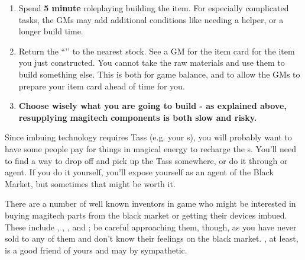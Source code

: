 \documentclass[green]{GL2020}
\begin{document}
\begin{enumerate}
\begin{enumerate}
  \item Spend \textbf{5 minute} roleplaying building the item. For especially complicated tasks, the GMs may add additional conditions like needing a helper, or a longer build time.
  \item Return the ``\iMagitechParts{}’’ to the nearest stock. See a GM for the item card for the item you just constructed. You cannot take the raw materials and use them to build something else. This is both for game balance, and to allow the GMs to prepare your item card ahead of time for you.
   \item \textbf{Choose wisely what you are going to build - as explained above, resupplying magitech components is both slow and risky.}
  \end{enumerate}
\end{enumerate}

Since imbuing technology requires Tass (e.g. your \iChargingStone{}s), you will probably want to have some people pay for things in magical energy to recharge the \iChargingStone{}s. You’ll need to find a way to drop off and pick up the Tass somewhere, or do it through \cChupSecond{} or \cChupSecond{\their} agent. If you do it yourself, you’ll expose yourself as an agent of the Black Market, but sometimes that might be worth it.

There are a number of well known inventors in game who might be interested in buying magitech parts from the black market or getting their devices imbued. These include \cTechStar{}, \cAssistantScientist{}, \cBunker{}, and \cHeadScientist{}; be careful approaching them, though, as you have never sold to any of them and don’t know their feelings on the black market. \cHeadScientist{}, at least, is a good friend of yours and may by sympathetic.
\end{document}
